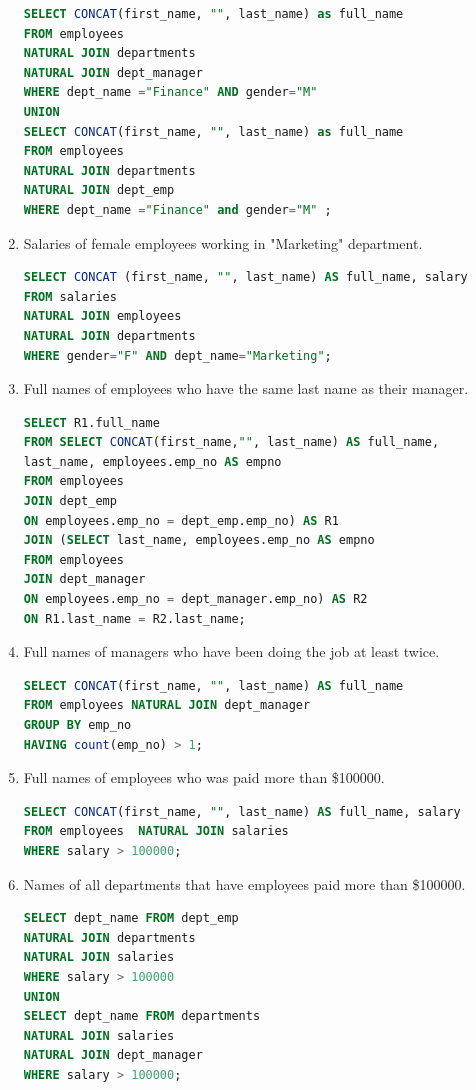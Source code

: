 \documentclass{article}
\begin{document}
\begin{enumerate}
	\begin{lstlisting}[language=SQL]	
SELECT CONCAT(first_name, "", last_name) as full_name
FROM employees
NATURAL JOIN departments
NATURAL JOIN dept_manager
WHERE dept_name ="Finance" AND gender="M" 
UNION 
SELECT CONCAT(first_name, "", last_name) as full_name 
FROM employees
NATURAL JOIN departments 
NATURAL JOIN dept_emp
WHERE dept_name ="Finance" and gender="M" ;
	\end{lstlisting}
	
	
	\item Salaries of female employees working in "Marketing" department.\\
	
	\begin{lstlisting}[language=SQL]	
SELECT CONCAT (first_name, "", last_name) AS full_name, salary 
FROM salaries 
NATURAL JOIN employees
NATURAL JOIN departments
WHERE gender="F" AND dept_name="Marketing";
	\end{lstlisting}
	
	\item Full names of employees who have the same last name as their manager.\\
	
	\begin{lstlisting}[language=SQL]	
SELECT R1.full_name
FROM SELECT CONCAT(first_name,"", last_name) AS full_name,
last_name, employees.emp_no AS empno 
FROM employees
JOIN dept_emp
ON employees.emp_no = dept_emp.emp_no) AS R1
JOIN (SELECT last_name, employees.emp_no AS empno 
FROM employees
JOIN dept_manager 
ON employees.emp_no = dept_manager.emp_no) AS R2
ON R1.last_name = R2.last_name;	
	\end{lstlisting}
	
	\item Full names of managers who have been doing the job at least twice.\\
	
	\begin{lstlisting}[language=SQL]	
SELECT CONCAT(first_name, "", last_name) AS full_name
FROM employees NATURAL JOIN dept_manager
GROUP BY emp_no 
HAVING count(emp_no) > 1;
	\end{lstlisting}
	
	\item Full names of employees who was paid more than \$100000.
	
	\begin{lstlisting}[language=SQL]
SELECT CONCAT(first_name, "", last_name) AS full_name, salary 
FROM employees	NATURAL JOIN salaries
WHERE salary > 100000;
	\end{lstlisting}
	
	\item Names of all departments that have employees paid more than \$100000.\\
	
	\begin{lstlisting}[language=SQL]
SELECT dept_name FROM dept_emp
NATURAL JOIN departments 
NATURAL JOIN salaries
WHERE salary > 100000
UNION
SELECT dept_name FROM departments 
NATURAL JOIN salaries 
NATURAL JOIN dept_manager
WHERE salary > 100000;
	\end{lstlisting}
\end{enumerate}
\end{document}
